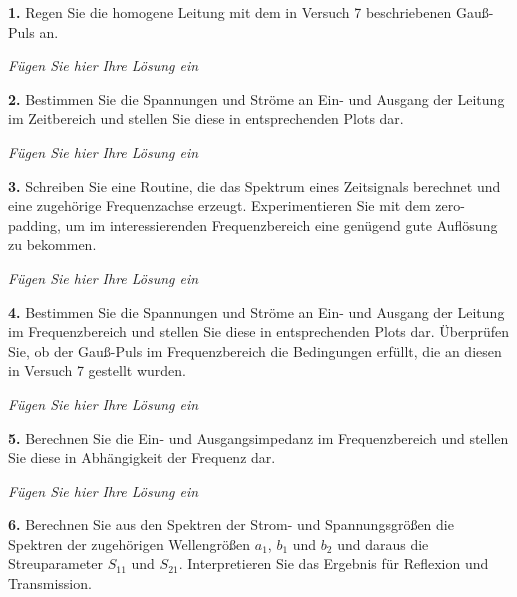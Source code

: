 \documentclass[Protokollheft.tex]{subfiles}
\begin{document}
\begin{framed}
	\noindent \textbf{1.} Regen Sie die homogene Leitung mit dem in Versuch 7 beschriebenen
Gauß-Puls an.\label{exer:exciteGauss}
\end{framed}

\emph{Fügen Sie hier Ihre Lösung ein}

\begin{framed}
	\noindent \textbf{2.} Bestimmen Sie die Spannungen und Ströme an Ein- und Ausgang der Leitung
 im Zeitbereich und stellen Sie diese in entsprechenden Plots dar.\label{exer:UandVtimeDomain}
\end{framed}

\emph{Fügen Sie hier Ihre Lösung ein}

\begin{framed}
	\noindent \textbf{3.} Schreiben Sie eine Routine, die das Spektrum eines
Zeitsignals berechnet und eine zugehörige Frequenzachse erzeugt.
Experimentieren Sie mit dem zero-padding, um im interessierenden
Frequenzbereich eine genügend gute Auflösung zu bekommen.\label{exer:calcFreqSpectWithAxis}
\end{framed}

\emph{Fügen Sie hier Ihre Lösung ein}

\begin{framed}
	\noindent \textbf{4.} Bestimmen Sie die Spannungen und Ströme an Ein- und Ausgang der Leitung 
im Frequenzbereich und stellen Sie diese in entsprechenden Plots dar. Überprüfen Sie, ob 
der Gauß-Puls im Frequenzbereich die Bedingungen erfüllt, die an 
diesen in Versuch 7 gestellt wurden.\label{exer:UandVfreqDomain}
\end{framed}

\emph{Fügen Sie hier Ihre Lösung ein}

\begin{framed}
	\noindent \textbf{5.} Berechnen Sie die Ein- und Ausgangsimpedanz im Frequenzbereich und stellen 
Sie diese in Abhängigkeit der Frequenz dar.\label{exer:ZfreqDomain}
\end{framed}

\emph{Fügen Sie hier Ihre Lösung ein}

\begin{framed}
	\noindent \textbf{6.} Berechnen Sie aus den Spektren der Strom- und 
Spannungsgrößen die Spektren der zugehörigen Wellengrößen $a_1$,
$b_1$ und $b_2$ und daraus die Streuparameter $S_{11}$ und
$S_{21}$. Interpretieren Sie das Ergebnis für Reflexion und
Transmission.\label{exer:calcWaveQuantities}
\end{framed}
\end{document}

